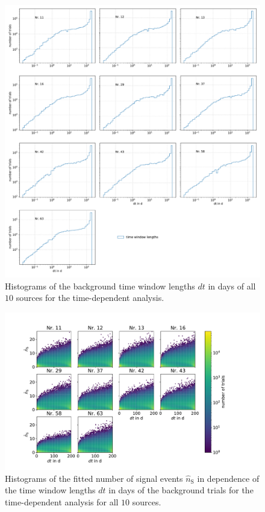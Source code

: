 \begin{figure}
    \centering
    \includegraphics[width=\linewidth]{Plots/05_csky/9_years_gfu_gold_time_dep_bg_dt.pdf}
    \caption{Histograms of the background time window lengths $dt$ in days of all $\num{10}$ sources for the time-dependent analysis.}
    \label{fig:bg_trials_time_dep_time_windows}
\end{figure}

\begin{figure}
    \centering
    \includegraphics[width=\linewidth]{Plots/05_csky/time_window_ns_bg_time_dep.pdf}
    \caption{Histograms of the fitted number of signal events $\hat{n}_\text{S}$ in dependence of the time window lengths $dt$ in days of the background trials for the time-dependent analysis for all $\num{10}$ sources.}
    \label{fig:bg_trials_time_dep_time_windows_ns}
\end{figure}


